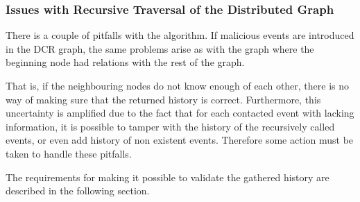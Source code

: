 	\subsubsection{Issues with Recursive Traversal of the Distributed Graph}
	
	There is a couple of pitfalls with the algorithm. If malicious events are introduced in the DCR graph, the same problems arise as with the graph where the beginning node had relations with the rest of the graph. 
	
	\newpar That is, if the neighbouring nodes do not know enough of each other, there is no way of making sure that the returned history is correct. Furthermore, this uncertainty is amplified due to the fact that for each contacted event with lacking information, it is possible to tamper with the history of the recursively called events, or even add history of non existent events. Therefore some action must be taken to handle these pitfalls.
	
	The requirements for making it possible to validate the gathered history are described in the following section. 
	
